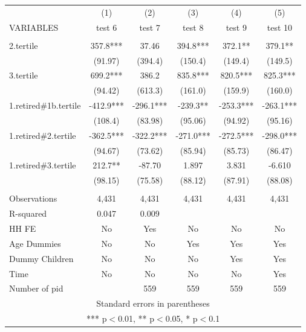 \begin{tabular}{lccccc} \hline
 & (1) & (2) & (3) & (4) & (5) \\
VARIABLES & test 6 & test 7 & test 8 & test 9 & test 10 \\ \hline
 &  &  &  &  &  \\
2.tertile & 357.8*** & 37.46 & 394.8*** & 372.1** & 379.1** \\
 & (91.97) & (394.4) & (150.4) & (149.4) & (149.5) \\
3.tertile & 699.2*** & 386.2 & 835.8*** & 820.5*** & 825.3*** \\
 & (94.42) & (613.3) & (161.0) & (159.9) & (160.0) \\
1.retired\#1b.tertile & -412.9*** & -296.1*** & -239.3** & -253.3*** & -263.1*** \\
 & (108.4) & (83.98) & (95.06) & (94.92) & (95.16) \\
1.retired\#2.tertile & -362.5*** & -322.2*** & -271.0*** & -272.5*** & -298.0*** \\
 & (94.67) & (73.62) & (85.94) & (85.73) & (86.47) \\
1.retired\#3.tertile & 212.7** & -87.70 & 1.897 & 3.831 & -6.610 \\
 & (98.15) & (75.58) & (88.12) & (87.91) & (88.08) \\
 &  &  &  &  &  \\
Observations & 4,431 & 4,431 & 4,431 & 4,431 & 4,431 \\
R-squared & 0.047 & 0.009 &  &  &  \\
HH FE & No & Yes & No & No & No \\
Age Dummies & No & No & Yes & Yes & Yes \\
Dummy Children & No & No & No & Yes & Yes \\
Time & No & No & No & No & Yes \\
 Number of pid &  & 559 & 559 & 559 & 559 \\ \hline
\multicolumn{6}{c}{ Standard errors in parentheses} \\
\multicolumn{6}{c}{ *** p$<$0.01, ** p$<$0.05, * p$<$0.1} \\
\end{tabular}
